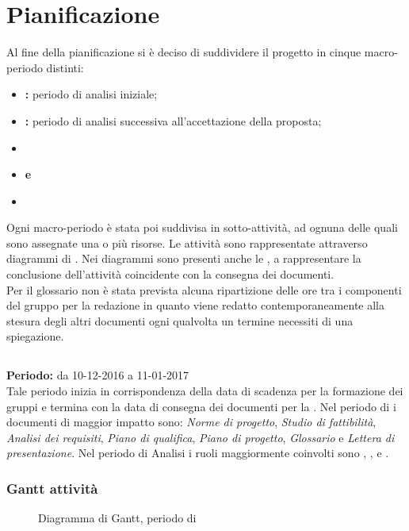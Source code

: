 \section{Pianificazione}

Al fine della pianificazione si è deciso di suddividere il progetto in cinque macro-periodo distinti:
\begin{itemize}
\item \textbf{\AR{}:} periodo di analisi iniziale;
\item \textbf{\AD{}:} periodo di analisi successiva all'accettazione della proposta;
\item \textbf{\PA{}}
\item \textbf{\PD{} e \Cod{}}
\item \textbf{\VV{}}
\end{itemize}
Ogni macro-periodo è stata poi suddivisa in sotto-attività, ad ognuna delle quali sono assegnate una o più risorse. Le attività sono rappresentate attraverso diagrammi di . Nei diagrammi sono presenti anche le , a rappresentare la conclusione dell'attività coincidente con la consegna dei documenti. \\
Per il glossario non è stata prevista alcuna ripartizione delle ore tra i componenti del gruppo per la redazione in quanto viene redatto contemporaneamente alla stesura degli altri documenti ogni qualvolta un termine necessiti di una spiegazione.

\subsection{\AR{}}
\textbf{Periodo:} da 10-12-2016 a 11-01-2017 \\
Tale periodo inizia in corrispondenza della data di scadenza per la formazione dei gruppi e termina con la data di consegna dei documenti per la \RR{}. Nel periodo di \AR{} i documenti di maggior impatto sono: \textit{Norme di progetto}, \textit{Studio di fattibilità}, \textit{Analisi dei requisiti}, \textit{Piano di qualifica}, \textit{Piano di progetto}, \textit{Glossario} e \textit{Lettera di presentazione}.
Nel periodo di Analisi i ruoli maggiormente coinvolti sono \Analista{}, \Responsabile{}, \Amministratore{} e \Verificatore{}.

\subsubsection{Gantt attività}
\begin{figure}[H]
\centering
{}
\caption{Diagramma di Gantt, periodo di \AR{}}
\end{figure}

